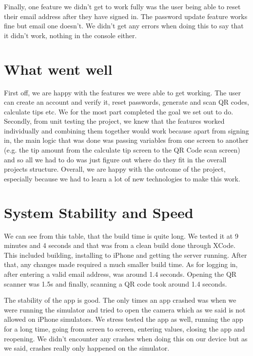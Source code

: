 Finally, one feature we didn't get to work fully was the user being able to reset their email address after they have signed in. The password update feature works fine but email one doesn't. We didn't get any errors when doing this to say that it didn't work, nothing in the console either. 

\section{What went well}
First off, we are happy with the features we were able to get working. The user can create an account and verify it, reset passwords, generate and scan QR codes, calculate tips etc. We for the most part completed the goal we set out to do. Secondly, from unit testing the project, we knew that the features worked individually and combining them together would work because apart from signing in, the main logic that was done was passing variables from one screen to another (e.g. the tip amount from the calculate tip screen to the QR Code scan screen) and so all we had to do was just figure out where do they fit in the overall projects structure. Overall, we are happy with the outcome of the project, especially because we had to learn a lot of new technologies to make this work.
\section{System Stability and Speed}
We can see from this table, that the build time is quite long. We tested it at 9 minutes and 4 seconds and that was from a clean build done through XCode. This included building, installing to iPhone and getting the server running. After that, any changes made required a much smaller build time. As for logging in, after entering a valid email address, was around 1.4 seconds. Opening the QR scanner was 1.5s and finally, scanning a QR code took around 1.4 seconds. 

The stability of the app is good. The only times an app crashed was when we were running the simulator and tried to open the camera which as we said is not allowed on iPhone simulators. We stress tested the app as well, running the app for a long time, going from screen to screen, entering values, closing the app and reopening. We didn't encounter any crashes when doing this on our device but as we said, crashes really only happened on the simulator.

